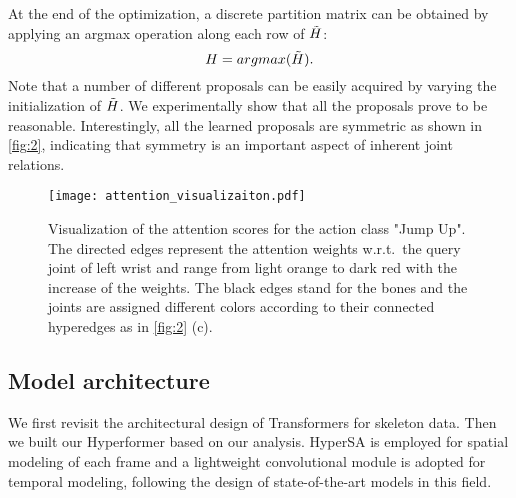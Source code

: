 \documentclass[10pt,twocolumn,letterpaper]{article}
\begin{document}



At the end of the optimization, a discrete partition matrix can be obtained by applying an argmax operation along each row of $\Tilde{H}$:
\begin{equation}
    H = argmax(\Tilde{H}).
\end{equation}
Note that a number of different proposals can be easily acquired by varying the initialization of $\Tilde{H}$. We experimentally show that all the proposals prove to be reasonable. Interestingly, all the learned proposals are symmetric as shown in \cref{fig:2}, indicating that symmetry is an important aspect of inherent joint relations. 

\begin{figure*}[ht]
  \centering
      \texttt{[image: attention\_visualizaiton.pdf]}
     \caption{Visualization of the attention scores for the action class "Jump Up". The directed edges represent the attention weights w.r.t.~the query joint of left wrist and range from light orange to dark red with the increase of the weights. The black edges stand for the bones and the joints are assigned different colors according to their connected hyperedges as in \cref{fig:2} (c). }
     \label{fig:attention}
\end{figure*}

\subsection{Model architecture}

We first revisit the architectural design of Transformers for skeleton data.
Then we built our Hyperformer based on our analysis. HyperSA is employed for spatial modeling of each frame and a lightweight convolutional module is adopted for temporal modeling, following the design of state-of-the-art models \cite{chi2022infogcn, chen2021channel} in this field. 
\end{document}
